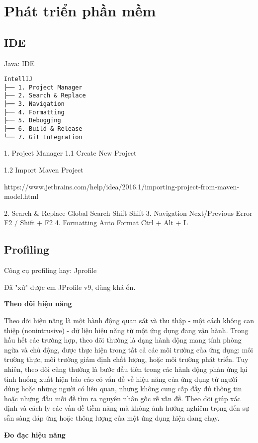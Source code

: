 \part{Phát triển phần mềm}

\chapter{IDE}

Java: IDE
\begin{lstlisting}
IntellIJ
├── 1. Project Manager
├── 2. Search & Replace
├── 3. Navigation
├── 4. Formatting
├── 5. Debugging
├── 6. Build & Release
└── 7. Git Integration
\end{lstlisting}

1. Project Manager
1.1 Create New Project

1.2 Import Maven Project

https://www.jetbrains.com/help/idea/2016.1/importing-project-from-maven-model.html

2. Search & Replace
Global Search	Shift Shift
3. Navigation
Next/Previous Error	F2 / Shift + F2
4. Formatting
Auto Format	Ctrl + Alt + L

\chapter{Profiling}

Công cụ profiling hay: Jprofile

Đã "xử" được em JProfile v9, dùng khá ổn. 

\textbf{Theo dõi hiệu năng}

Theo dõi hiệu năng là một hành động quan sát và thu thập - một cách không can thiệp (nonintrusive) - dữ liệu hiệu năng từ một ứng dụng đang vận hành. Trong hầu hết các trường hợp, theo dõi thường là dạng hành động mang tính phòng ngừa và chủ động, được thực hiện trong tất cả các môi trường của ứng dụng: môi trường thực, môi trường giám định chất lượng, hoặc môi trường phát triển. Tuy nhiên, theo dõi cũng thường là bước đầu tiên trong các hành động phản ứng lại tình huống xuất hiện báo cáo có vấn đề về hiệu năng của ứng dụng từ người dùng hoặc những người có liên quan, nhưng không cung cấp đầy đủ thông tin hoặc những đầu mối đề tìm ra nguyên nhân gốc rễ vấn đề. Theo dõi giúp xác định và cách ly các vấn đề tiềm năng mà không ảnh hưởng nghiêm trọng đến sự sẵn sàng đáp ứng hoặc thông lượng của một ứng dụng hiện đang chạy.

\textbf{Đo đạc hiệu năng}

